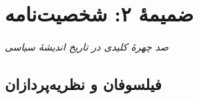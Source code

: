 \chapter*{ضمیمهٔ ۲: شخصیت‌نامه}

\begin{center}
\textit{صد چهرهٔ کلیدی در تاریخ اندیشهٔ سیاسی}
\end{center}

\vspace{5mm}

\section*{فیلسوفان و نظریه‌پردازان}

